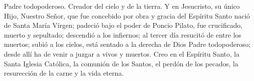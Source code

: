 Padre todopoderoso. Creador del cielo y de la tierra. Y en Jesucristo, su único Hijo, Nuestro Señor,
que fue concebido por obra y gracia del Espíritu Santo nació de Santa María Vírgen; padeció bajo el poder de Poncio Pilato,
fue crucificado, muerto y sepultado; descendió a los infiernos; al tercer día resucitó de entre los muertos; subió a los cielos,
está sentado a la derecha de Dios Padre todopoderoso; desde allí ha de venir a juzgar a vivos y muertos.
Creo en el Espíritu Santo, la Santa Iglesia Católica, la comunión de los Santos, el perdón de los pecados,
la resurección de la carne y la vida eterna. 